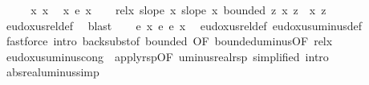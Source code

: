 \begin{isabellebody}
%
\isadelimproof
%
\endisadelimproof
%
\isatagproof
{}\isamarkupfalse%
\ {\isacharminus}{\kern0pt}\isanewline
\ \ \isamarkupfalse%
\ x\ x{\isacharprime}{\kern0pt}\ \isamarkupfalse%
\ {\isachardoublequoteopen}x\ {\isasymsim}\isactrlsub e\ x{\isacharprime}{\kern0pt}{\isachardoublequoteclose}\isanewline
\ \ \isamarkupfalse%
\ rel{\isacharunderscore}{\kern0pt}x{\isacharcolon}{\kern0pt}\ {\isachardoublequoteopen}slope\ x{\isachardoublequoteclose}\ {\isachardoublequoteopen}slope\ x{\isacharprime}{\kern0pt}{\isachardoublequoteclose}\ {\isachardoublequoteopen}bounded\ {\isacharparenleft}{\kern0pt}{\isasymlambda}z{\isachardot}{\kern0pt}\ x\ z\ {\isacharminus}{\kern0pt}\ x{\isacharprime}{\kern0pt}\ z{\isacharparenright}{\kern0pt}{\isachardoublequoteclose}\ \isamarkupfalse%
\ eudoxus{\isacharunderscore}{\kern0pt}rel{\isacharunderscore}{\kern0pt}def\ \isamarkupfalse%
\ blast{\isacharplus}{\kern0pt}\isanewline
\ \ \isamarkupfalse%
\ {\isachardoublequoteopen}{\isacharminus}{\kern0pt}\isactrlsub e\ x\ {\isasymsim}\isactrlsub e\ {\isacharminus}{\kern0pt}\isactrlsub e\ x{\isacharprime}{\kern0pt}{\isachardoublequoteclose}\ \isamarkupfalse%
\ eudoxus{\isacharunderscore}{\kern0pt}rel{\isacharunderscore}{\kern0pt}def\ eudoxus{\isacharunderscore}{\kern0pt}uminus{\isacharunderscore}{\kern0pt}def\ \isamarkupfalse%
\ {\isacharparenleft}{\kern0pt}fastforce\ intro{\isacharcolon}{\kern0pt}\ back{\isacharunderscore}{\kern0pt}subst{\isacharbrackleft}{\kern0pt}of\ bounded{\isacharcomma}{\kern0pt}\ OF\ bounded{\isacharunderscore}{\kern0pt}uminus{\isacharbrackleft}{\kern0pt}OF\ rel{\isacharunderscore}{\kern0pt}x{\isacharparenleft}{\kern0pt}{}{\isacharparenright}{\kern0pt}{\isacharbrackright}{\kern0pt}{\isacharbrackright}{\kern0pt}{\isacharparenright}{\kern0pt}\isanewline
{}\isamarkupfalse%
%
\endisatagproof
{\isafoldproof}%
%
\isadelimproof
\isanewline
%
\endisadelimproof
\isanewline
{}\isamarkupfalse%
\ eudoxus{\isacharunderscore}{\kern0pt}uminus{\isacharunderscore}{\kern0pt}cong\ {\isacharequal}{\kern0pt}\ apply{\isacharunderscore}{\kern0pt}rsp{\isacharprime}{\kern0pt}{\isacharbrackleft}{\kern0pt}OF\ uminus{\isacharunderscore}{\kern0pt}real{\isachardot}{\kern0pt}rsp{\isacharcomma}{\kern0pt}\ simplified{\isacharcomma}{\kern0pt}\ intro{\isacharbrackright}{\kern0pt}\isanewline
\isanewline
{}\isamarkupfalse%
\ abs{\isacharunderscore}{\kern0pt}real{\isacharunderscore}{\kern0pt}uminus{\isacharbrackleft}{\kern0pt}simp{\isacharbrackright}{\kern0pt}{\isacharcolon}{\kern0pt}\ \isanewline

\end{isabellebody}

